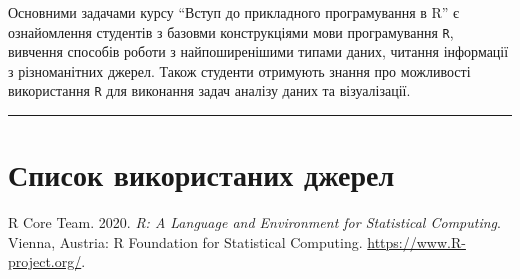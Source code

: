 \documentclass[
  letterpaper,
  DIV=11,
  numbers=noendperiod]{scrreprt}
\newlength{\cslhangindent}
\newlength{\cslentryspacingunit} %
\newenvironment{CSLReferences}[2] %
 {%
  \setlength{\parindent}{0pt}
  \ifodd #1
  \let\oldpar\par
  \def\par{\hangindent=\cslhangindent\oldpar}
  \fi
  \setlength{\parskip}{#2\cslentryspacingunit}
 }%
 {}
\begin{document}
Основними задачами курсу ``Вступ до прикладного програмування в R'' є
ознайомлення студентів з базовми конструкціями мови програмування
\texttt{R}, вивчення способів роботи з найпоширенішими типами даних,
читання інформації з різноманітних джерел. Також студенти отримують
знання про можливості використання \texttt{R} для виконання задач
аналізу даних та візуалізації.

\begin{center}\rule{0.5\linewidth}{0.5pt}\end{center}


\hypertarget{ux441ux43fux438ux441ux43eux43a-ux432ux438ux43aux43eux440ux438ux441ux442ux430ux43dux438ux445-ux434ux436ux435ux440ux435ux43b}{%
\chapter*{Список використаних
джерел}\label{ux441ux43fux438ux441ux43eux43a-ux432ux438ux43aux43eux440ux438ux441ux442ux430ux43dux438ux445-ux434ux436ux435ux440ux435ux43b}}

\hypertarget{refs}{}
\begin{CSLReferences}{1}{0}
\leavevmode{}%
R Core Team. 2020. \emph{R: A Language and Environment for Statistical
Computing}. Vienna, Austria: R Foundation for Statistical Computing.
\url{https://www.R-project.org/}.

\end{CSLReferences}
\end{document}
